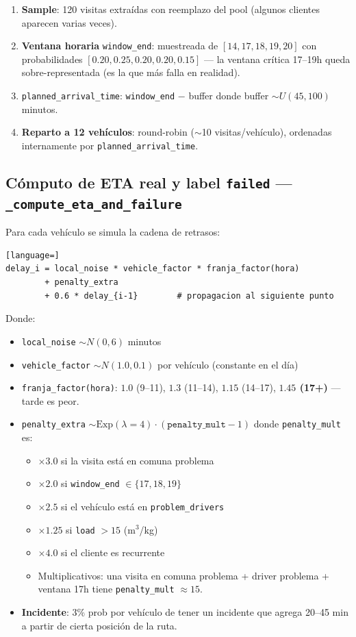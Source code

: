 \documentclass[11pt,a4paper]{article}
\begin{document}
\begin{enumerate}
  \item \textbf{Sample}: 120 visitas extraídas con reemplazo del pool (algunos clientes aparecen varias veces).
  \item \textbf{Ventana horaria} \texttt{window\_end}: muestreada de $[14, 17, 18, 19, 20]$ con probabilidades $[0.20, 0.25, 0.20, 0.20, 0.15]$ --- la ventana crítica 17--19h queda sobre-representada (es la que más falla en realidad).
  \item \texttt{planned\_arrival\_time}: \texttt{window\_end} $-$ buffer donde buffer $\sim U(45, 100)$ minutos.
  \item \textbf{Reparto a 12 vehículos}: round-robin ($\sim$10 visitas/vehículo), ordenadas internamente por \texttt{planned\_arrival\_time}.
\end{enumerate}

\subsection{Cómputo de ETA real y label \texttt{failed} --- \texttt{\_compute\_eta\_and\_failure}}

Para cada vehículo se simula la cadena de retrasos:

\begin{lstlisting}[language=]
delay_i = local_noise * vehicle_factor * franja_factor(hora)
        + penalty_extra
        + 0.6 * delay_{i-1}        # propagacion al siguiente punto
\end{lstlisting}

Donde:
\begin{itemize}
  \item \texttt{local\_noise} $\sim N(0, 6)$ minutos
  \item \texttt{vehicle\_factor} $\sim N(1.0, 0.1)$ por vehículo (constante en el día)
  \item \texttt{franja\_factor(hora)}: $1.0$ (9--11), $1.3$ (11--14), $1.15$ (14--17), \textbf{$1.45$ (17+)} --- tarde es peor.
  \item \texttt{penalty\_extra} $\sim \mathrm{Exp}(\lambda{=}4) \cdot (\texttt{penalty\_mult} - 1)$ donde \texttt{penalty\_mult} es:
    \begin{itemize}
      \item $\times 3.0$ si la visita está en comuna problema
      \item $\times 2.0$ si \texttt{window\_end} $\in \{17, 18, 19\}$
      \item $\times 2.5$ si el vehículo está en \texttt{problem\_drivers}
      \item $\times 1.25$ si \texttt{load} $> 15$ (m$^3$/kg)
      \item $\times 4.0$ si el cliente es recurrente
      \item Multiplicativos: una visita en comuna problema + driver problema + ventana 17h tiene \texttt{penalty\_mult} $\approx 15$.
    \end{itemize}
  \item \textbf{Incidente}: 3\% prob por vehículo de tener un incidente que agrega 20--45 min a partir de cierta posición de la ruta.
\end{itemize}
\end{document}
